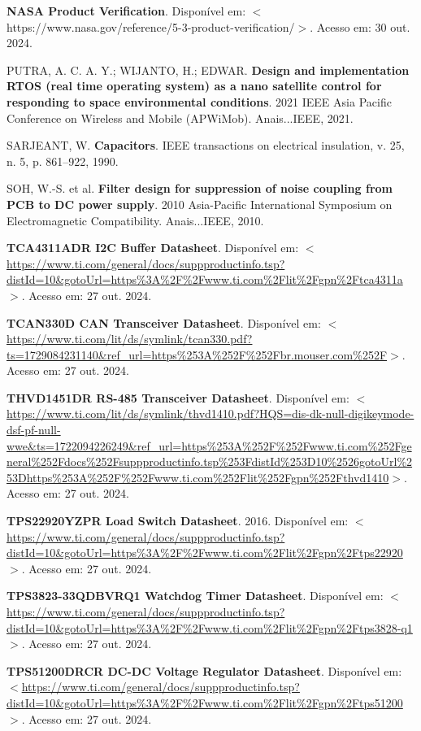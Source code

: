 \begin{flushleft}
\begin{thebibliography}{00}
 \textbf{NASA Product Verification}. Disponível em: $<$https://www.nasa.gov/reference/5-3-product-verification/$>$. Acesso em: 30 out. 2024.

 PUTRA, A. C. A. Y.; WIJANTO, H.; EDWAR. \textbf{Design and implementation RTOS (real time operating system) as a nano satellite control for responding to space environmental conditions}. 2021 IEEE Asia Pacific Conference on Wireless and Mobile (APWiMob). Anais...IEEE, 2021.

 SARJEANT, W. \textbf{Capacitors}. IEEE transactions on electrical insulation, v. 25, n. 5, p. 861–922, 1990.

 SOH, W.-S. et al. \textbf{Filter design for suppression of noise coupling from PCB to DC power supply}. 2010 Asia-Pacific International Symposium on Electromagnetic Compatibility. Anais...IEEE, 2010.

 \textbf{TCA4311ADR I2C Buffer Datasheet}. Disponível em: $<$\url{https://www.ti.com/general/docs/suppproductinfo.tsp?distId=10\&gotoUrl=https\%3A\%2F\%2Fwww.ti.com\%2Flit\%2Fgpn\%2Ftca4311a}$>$. Acesso em: 27 out. 2024. 

 \textbf{TCAN330D CAN Transceiver Datasheet}. Disponível em: $<$\url{https://www.ti.com/lit/ds/symlink/tcan330.pdf?ts=1729084231140\&ref\_url=https\%253A\%252F\%252Fbr.mouser.com\%252F}$>$. Acesso em: 27 out. 2024. 

 \textbf{THVD1451DR RS-485 Transceiver Datasheet}. Disponível em: $<$\url{https://www.ti.com/lit/ds/symlink/thvd1410.pdf?HQS=dis-dk-null-digikeymode-dsf-pf-null-wwe\&ts=1722094226249\&ref\_url=https\%253A\%252F\%252Fwww.ti.com\%252Fgeneral\%252Fdocs\%252Fsuppproductinfo.tsp\%253FdistId\%253D10\%2526gotoUrl\%253Dhttps\%253A\%252F\%252Fwww.ti.com\%252Flit\%252Fgpn\%252Fthvd1410}$>$. Acesso em: 27 out. 2024. 

 \textbf{TPS22920YZPR Load Switch Datasheet}. 2016. Disponível em: $<$\url{https://www.ti.com/general/docs/suppproductinfo.tsp?distId=10\&gotoUrl=https\%3A\%2F\%2Fwww.ti.com\%2Flit\%2Fgpn\%2Ftps22920}$>$. Acesso em: 27 out. 2024. 

 \textbf{TPS3823-33QDBVRQ1 Watchdog Timer Datasheet}. Disponível em: $<$\url{https://www.ti.com/general/docs/suppproductinfo.tsp?distId=10\&gotoUrl=https\%3A\%2F\%2Fwww.ti.com\%2Flit\%2Fgpn\%2Ftps3828-q1}$>$. Acesso em: 27 out. 2024. 

 \textbf{TPS51200DRCR DC-DC Voltage Regulator Datasheet}. Disponível em: $<$\url{https://www.ti.com/general/docs/suppproductinfo.tsp?distId=10\&gotoUrl=https\%3A\%2F\%2Fwww.ti.com\%2Flit\%2Fgpn\%2Ftps51200}$>$. Acesso em: 27 out. 2024. 


\end{thebibliography}
\end{flushleft}

